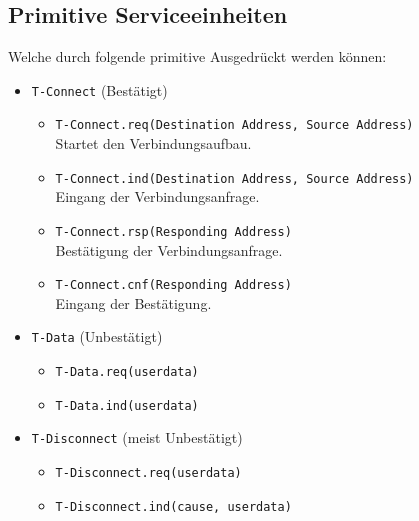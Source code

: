 \documentclass[a4paper, 11pt, accentcolor = tud3b]{tudreport}
\begin{document}
            \subsection{Primitive Serviceeinheiten}
	            Welche durch folgende primitive Ausgedrückt werden können:
	            \begin{itemize}
	            	\item \texttt{T-Connect} (Bestätigt)
		            	\begin{itemize}
		            		\item \texttt{T-Connect.req(Destination Address, Source Address)} \\ Startet den Verbindungsaufbau.
		            		\item \texttt{T-Connect.ind(Destination Address, Source Address)} \\ Eingang der Verbindungsanfrage.
		            		\item \texttt{T-Connect.rsp(Responding Address)} \\ Bestätigung der Verbindungsanfrage.
		            		\item \texttt{T-Connect.cnf(Responding Address)} \\ Eingang der Bestätigung.
		            	\end{itemize}
		            \item \texttt{T-Data} (Unbestätigt)
			            \begin{itemize}
			            	\item \texttt{T-Data.req(userdata)}
			            	\item \texttt{T-Data.ind(userdata)}
			            \end{itemize}
		            \item \texttt{T-Disconnect} (meist Unbestätigt)
			            \begin{itemize}
			            	\item \texttt{T-Disconnect.req(userdata)}
			            	\item \texttt{T-Disconnect.ind(cause, userdata)}
			            \end{itemize}
	            \end{itemize}
	            
\end{document}
